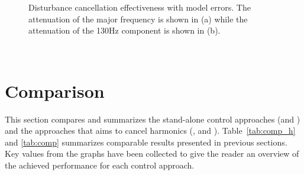 \begin{figure}[h!]
  \centering %
  \qquad
  \caption{\label{fig:rfdc_model_error} Disturbance cancellation effectiveness with model errors. The attenuation of the major frequency is shown in (a) while the attenuation of the 130Hz component is shown in (b).}
\end{figure}

\newpage~\newpage
\FloatBarrier
\section{Comparison}\label{sec:comparison}
This section compares and summarizes the stand-alone control approaches (\abbrIRC and \abbrMRACPE) and the approaches that aims to cancel harmonics (\abbrFDC, \abbrRFDC and \abbrIMP). Table~\ref{tab:comp_h} and \ref{tab:comp} summarizes comparable results presented in previous sections. Key values from the graphs have been collected to give the reader an overview of the achieved performance for each control approach.

